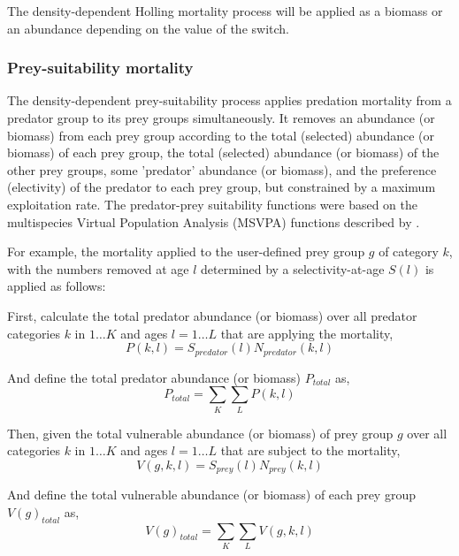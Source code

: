 The density-dependent Holling mortality process will be applied as a biomass or an abundance depending on the value of the  switch.

\subsubsection*{Prey-suitability mortality}

The density-dependent prey-suitability process applies predation mortality from a predator group to its prey groups simultaneously. It removes an abundance (or biomass) from each prey group according to the total (selected) abundance (or biomass) of each prey group, the total (selected) abundance (or biomass) of the other prey groups, some 'predator' abundance (or biomass), and the preference (electivity) of the predator to each prey group, but constrained by a maximum exploitation rate. The predator-prey suitability functions were based on the multispecies Virtual Population Analysis (MSVPA) functions described by \citep{JuradoMolina2005}.

For example, the mortality applied to the user-defined prey group $g$ of category $k$, with the numbers removed at age $l$ determined by a selectivity-at-age $S(l)$ is applied as follows:

First, calculate the total predator abundance (or biomass) over all predator categories $k$ in $1 \ldots K$ and ages $l = 1 \ldots L$ that are applying the mortality,
\begin{equation}
  P(k,l) = S_{predator}(l) N_{predator}(k,l)
\end{equation}

And define the total predator abundance (or biomass) $P_{total}$ as,
\begin{equation}
  P_{total}  = \sum\limits_K {\sum\limits_L {P(k,l)}} 
\end{equation}

Then, given the total vulnerable abundance (or biomass) of prey group $g$ over all categories $k$ in $1 \ldots K$ and ages $l = 1 \ldots L$ that are subject to the mortality,
\begin{equation}
  V(g,k,l) = S_{prey}(l) N_{prey}(k,l)
\end{equation}

And define the total vulnerable abundance (or biomass) of each prey group $V(g)_{total}$ as,
\begin{equation}
  V(g)_{total}  = \sum\limits_K {\sum\limits_L {V(g,k,l)}} 
\end{equation}

